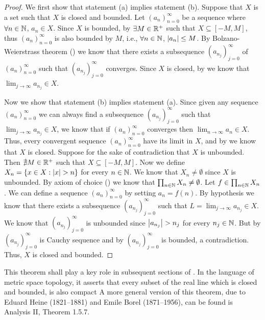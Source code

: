\begin{proof}
  We first show that statement (a) implies statement (b).
  Suppose that \(X\) is a set such that \(X\) is closed and bounded.
  Let \((a_n)_{n = 0}^\infty\) be a sequence where \(\forall n \in \mathbb{N}\), \(a_n \in X\).
  Since \(X\) is bounded, by  \(\exists M \in \mathbb{R}^+\) such that \(X \subseteq [-M, M]\), thus \((a_n)_{n = 0}^\infty\) is also bounded by \(M\), i.e., \(\forall n \in \mathbb{N}\), \(\left\lvert a_n\right\rvert \leq M\).
  By Bolzano-Weierstrass theorem () we know that there exists a subsequence \((a_{n_j})_{j = 0}^\infty\) of \((a_n)_{n = 0}^\infty\) such that \((a_{n_j})_{j = 0}^\infty\) converges.
  Since \(X\) is closed, by  we know that \(\lim_{j \to \infty} a_{n_j} \in X\).

  Now we show that statement (b) implies statement (a).
  Since given any sequence \((a_n)_{n = 0}^\infty\) we can always find a subsequence \((a_{n_j})_{j = 0}^\infty\) such that \(\lim_{j \to \infty} a_{n_j} \in X\), we know that if \((a_n)_{n = 0}^\infty\) converges then \(\lim_{n \to \infty} a_n \in X\).
  Thus, every convergent sequence \((a_n)_{n = 0}^\infty\) have its limit in \(X\), and by  we know that \(X\) is closed.
  Suppose for the sake of contradiction that \(X\) is unbounded.
  Then \(\nexists M \in \mathbb{R}^+\) such that \(X \subseteq [-M, M]\).
  Now we define \(X_n = \left\lbrace x \in X : \left\lvert x\right\rvert > n\right\rbrace\) for every \(n \in \mathbb{N}\).
  We know that \(X_n \neq \emptyset\) since \(X\) is unbounded.
  By axiom of choice () we know that \(\prod_{n \in \mathbb{N}} X_n \neq \emptyset\).
  Let \(f \in \prod_{n \in \mathbb{N}} X_n\).
  We can define a sequence \((a_n)_{n = 0}^\infty\) by setting \(a_n = f(n)\).
  By hypothesis we know that there exists a subsequence \((a_{n_j})_{j = 0}^\infty\) such that \(L = \lim_{j \to \infty} a_{n_j} \in X\).
  We know that \((a_{n_j})_{j = 0}^\infty\) is unbounded since \(\left\lvert a_{n_j}\right\rvert > n_j\) for every \(n_j \in \mathbb{N}\).
  But by  \((a_{n_j})_{j = 0}^\infty\) is Cauchy sequence and by  \((a_{n_j})_{j = 0}^\infty\) is bounded, a contradiction.
  Thus, \(X\) is closed and bounded.
\end{proof}

\begin{rmk}\label{i:9.1.25}
  This theorem shall play a key role in subsequent sections of .
  In the language of metric space topology, it asserts that every subset of the real line which is closed and bounded, is also compact
  A more general version of this theorem, due to Eduard Heine (1821--1881) and Emile Borel (1871--1956), can be found is Analysis II, Theorem 1.5.7.
\end{rmk}

